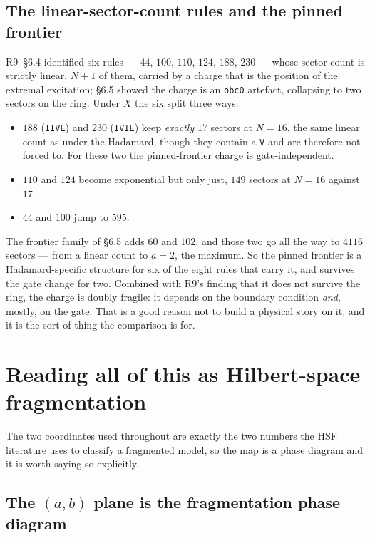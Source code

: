 \documentclass[11pt]{article}
\newcommand{\rt}[1]{\texttt{#1}}
\theoremstyle{plain}
\theoremstyle{remark}
\begin{document}
\subsection{The linear-sector-count rules and the pinned frontier}

R9~\S6.4 identified six rules --- $44$, $100$, $110$, $124$, $188$, $230$ --- whose
sector count is strictly linear, $N+1$ of them, carried by a charge that is the
position of the extremal excitation; \S6.5 showed the charge is an \rt{obc0}
artefact, collapsing to two sectors on the ring. Under $X$ the six split three
ways:

\begin{itemize}
\item $188$ (\rt{IIVE}) and $230$ (\rt{IVIE}) keep \emph{exactly} $17$ sectors at
  $N=16$, the same linear count as under the Hadamard, though they contain a
  \rt{V} and are therefore not forced to. For these two the pinned-frontier charge
  is gate-independent.
\item $110$ and $124$ become exponential but only just, $149$ sectors at $N=16$
  against $17$.
\item $44$ and $100$ jump to $595$.
\end{itemize}

\noindent The frontier family of \S6.5 adds $60$ and $102$, and those two go all
the way to $4116$ sectors --- from a linear count to $a=2$, the maximum. So the
pinned frontier is a Hadamard-specific structure for six of the eight rules that
carry it, and survives the gate change for two. Combined with R9's finding that it
does not survive the ring, the charge is doubly fragile: it depends on the
boundary condition \emph{and}, mostly, on the gate. That is a good reason not to
build a physical story on it, and it is the sort of thing the comparison is for.

\section{Reading all of this as Hilbert-space fragmentation}
\label{sec:hsf}

The two coordinates used throughout are exactly the two numbers the HSF
literature uses to classify a fragmented model, so the map is a phase diagram
and it is worth saying so explicitly.

\subsection{The $(a,b)$ plane is the fragmentation phase diagram}
\end{document}
